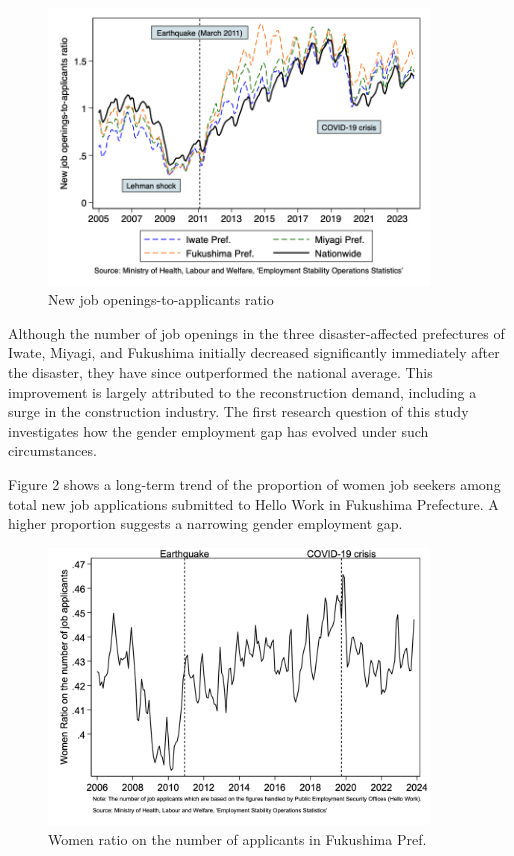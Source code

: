 \documentclass[12pt,halfline,a4paper]{ouparticle}
\begin{document}
\begin{figure}[h!]
    \centering
    \includegraphics[width=0.9\textwidth]{New job openings-to-applicants ratio.png}  %
    \caption{New job openings-to-applicants ratio}
    \label{fig:new_job_openings}
\end{figure}


\newpage

Although the number of job openings in the three disaster-affected prefectures of Iwate, Miyagi, and Fukushima initially decreased significantly immediately after the disaster, they have since outperformed the national average. This improvement is largely attributed to the reconstruction demand, including a surge in the construction industry. The first research question of this study investigates how the gender employment gap has evolved under such circumstances.


\newpage

Figure 2 shows a long-term trend of the proportion of women job seekers among total new job applications submitted to Hello Work in Fukushima Prefecture. A higher proportion suggests a narrowing gender employment gap. 

\begin{figure}[h!]
    \centering
    \includegraphics[width=0.9\textwidth]{Women ratio on the number of job applicants.jpg}  %
    \caption{Women ratio on the number of applicants in Fukushima Pref.}
    \label{fig:women_ratio_fukushima}
\end{figure}
\end{document}
